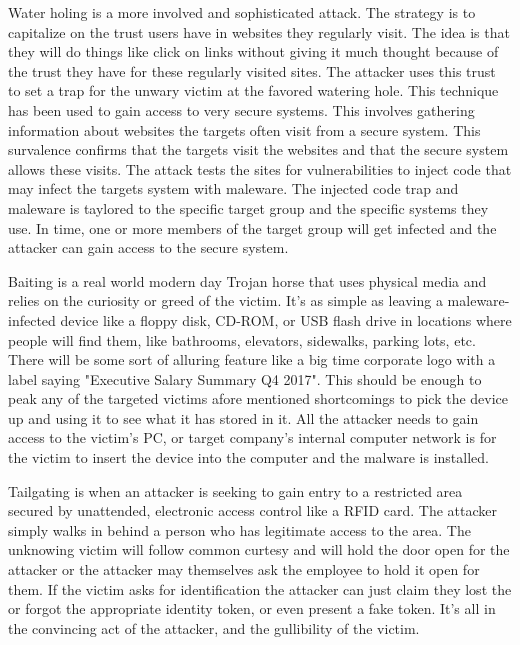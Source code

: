Water holing is a more involved and sophisticated attack. The strategy is to capitalize on the trust users have in websites they regularly visit. The idea is that they
will do things like click on links without giving it much thought because of the trust they have for these regularly visited sites. The attacker uses this trust to set
a trap for the unwary victim at the favored watering hole. This technique has been used to gain access to very secure systems. This involves gathering information about
websites the targets often visit from a secure system. This survalence confirms that the targets visit the websites and that the secure system allows these visits. The
attack tests the sites for vulnerabilities to inject code that may infect the targets system with maleware. The injected code trap and maleware is taylored to the
specific target group and the specific systems they use. In time, one or more members of the target group will get infected and the attacker can gain access to the
secure system.

Baiting is a real world modern day Trojan horse that uses physical media and relies on the curiosity or greed of the victim. It's as simple as leaving a maleware-infected
device like a floppy disk, CD-ROM, or USB flash drive in locations where people will find them, like bathrooms, elevators, sidewalks, parking lots, etc. There will be
some sort of alluring feature like a big time corporate logo with a label saying "Executive Salary Summary Q4 2017". This should be enough to peak any of the targeted
victims afore mentioned shortcomings to pick the device up and using it to see what it has stored in it. All the attacker needs to gain access to the victim's PC, or
target company's internal computer network is for the victim to insert the device into the computer and the malware is installed.

Tailgating is when an attacker is seeking to gain entry to a restricted area secured by unattended, electronic access control like a RFID card. The attacker simply walks
in behind a person who has legitimate access to the area. The unknowing victim will follow common curtesy and will hold the door open for the attacker or the attacker may
themselves ask the employee to hold it open for them. If the victim asks for identification the attacker can just claim they lost the or forgot the appropriate identity
token, or even present a fake token. It's all in the convincing act of the attacker, and the gullibility of the victim.
